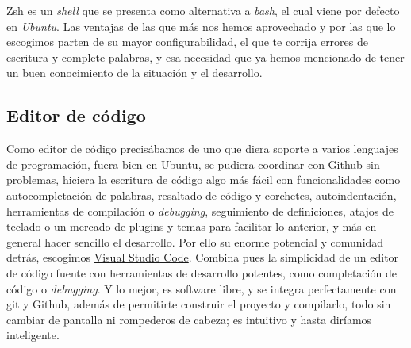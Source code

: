 {Zsh} es un \textit{shell} que se presenta como alternativa a \textit{bash}, el cual viene por defecto en 
\textit{Ubuntu}. Las ventajas de las que más nos hemos aprovechado y por las que lo escogimos parten de 
su mayor configurabilidad, el que te corrija errores de escritura y complete palabras, y esa necesidad que ya 
hemos mencionado de tener un buen conocimiento de la situación y el desarrollo.

\subsection{Editor de código}
Como editor de código precisábamos de uno que diera soporte a varios lenguajes de programación, fuera bien en 
Ubuntu, se pudiera coordinar con Github sin problemas, hiciera la escritura de código algo más fácil con 
funcionalidades como autocompletación de palabras, resaltado de código y corchetes, autoindentación, herramientas de 
compilación o \textit{debugging}, seguimiento de definiciones, atajos de teclado o un mercado de plugins y temas 
para facilitar lo anterior, y más en general hacer sencillo el desarrollo. Por ello su enorme potencial y comunidad 
detrás, escogimos \href{https://code.visualstudio.com/}{Visual Studio Code}. Combina pues la simplicidad 
de un editor de código fuente con herramientas de desarrollo potentes, como completación de código o 
\textit{debugging}. Y lo mejor, es software libre, y se integra perfectamente con git y Github, además de 
permitirte construir el proyecto y compilarlo, todo sin cambiar de pantalla ni rompederos de cabeza; es intuitivo 
y hasta diríamos inteligente.

